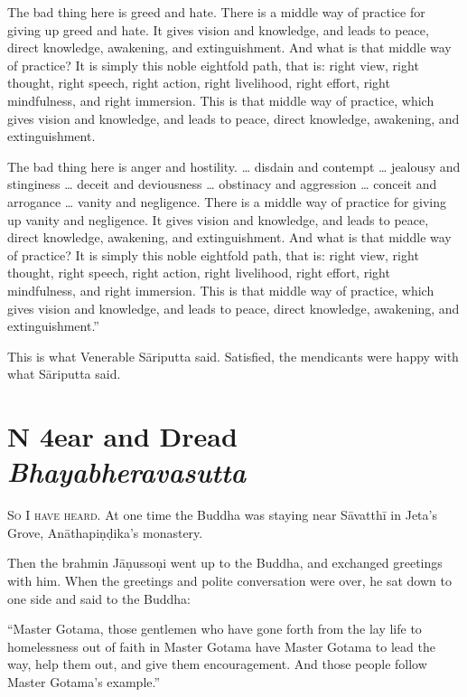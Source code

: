 \documentclass[12pt,openany]{book}%
\newcommand*{\suttatitleacronym}[1]{\smaller[2]{#1}\vspace*{.3em}}
\newcommand*{\suttatitletranslation}[1]{\linebreak{#1}}
\newcommand*{\suttatitleroot}[1]{\linebreak\smaller[2]\itshape{#1}}
\newcommand*{\tocacronym}[1]{\hspace*{-3.3em}{#1}\quad}
\newcommand*{\toctranslation}[1]{#1}
\newcommand*{\tocroot}[1]{(\textit{#1})}
\newcommand*{\scevam}[1]{\textsc{#1}}
\begin{document}
The bad thing here is greed and hate. There is a middle way of practice for giving up greed and hate. It gives vision and knowledge, and leads to peace, direct knowledge, awakening, and extinguishment. And what is that middle way of practice? It is simply this noble eightfold path, that is: right view, right thought, right speech, right action, right livelihood, right effort, right mindfulness, and right immersion. This is that middle way of practice, which gives vision and knowledge, and leads to peace, direct knowledge, awakening, and extinguishment. 

The bad thing here is anger and hostility. … disdain and contempt … jealousy and stinginess … deceit and deviousness … obstinacy and aggression … conceit and arrogance … vanity and negligence. There is a middle way of practice for giving up vanity and negligence. It gives vision and knowledge, and leads to peace, direct knowledge, awakening, and extinguishment. And what is that middle way of practice? It is simply this noble eightfold path, that is: right view, right thought, right speech, right action, right livelihood, right effort, right mindfulness, and right immersion. This is that middle way of practice, which gives vision and knowledge, and leads to peace, direct knowledge, awakening, and extinguishment.” 

This is what Venerable \textsanskrit{Sāriputta} said. Satisfied, the mendicants were happy with what \textsanskrit{Sāriputta} said. 

%
\section*{{\suttatitleacronym MN 4}{\suttatitletranslation Fear and Dread }{\suttatitleroot Bhayabheravasutta}}
\addcontentsline{toc}{section}{\tocacronym{MN 4} \toctranslation{Fear and Dread } \tocroot{Bhayabheravasutta}}

\scevam{So I have heard. }At one time the Buddha was staying near \textsanskrit{Sāvatthī} in Jeta’s Grove, \textsanskrit{Anāthapiṇḍika}’s monastery. 

Then the brahmin \textsanskrit{Jāṇussoṇi} went up to the Buddha, and exchanged greetings with him. When the greetings and polite conversation were over, he sat down to one side and said to the Buddha: 

“Master Gotama, those gentlemen who have gone forth from the lay life to homelessness out of faith in Master Gotama have Master Gotama to lead the way, help them out, and give them encouragement. And those people follow Master Gotama’s example.” 
\end{document}
